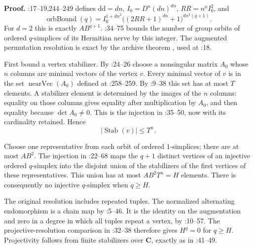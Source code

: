 \documentclass[11pt,a4paper]{article}
\theoremstyle{definition}
\renewcommand{\paragraph}[1]{\par\smallskip\noindent\textbf{#1}\quad\ignorespaces}
\begin{document}
\paragraph{Proof.}
:17--19,244--249 defines
$\mathrm{dd}=dn$, $I_0=D^n(dn)^{dn}$, $RR=n^nI_0^2$, and
\[
 \operatorname{orbBound}(q)
 =I_0^{1+dn^2}\bigl((2RR+1)^{dn}+1\bigr)^{dn^2(q+1)}.
\]
For $d=2$ this is exactly $AB^{q+1}$.
:34--75 bounds the number
of group orbits of ordered $q$-simplices of its Hermitian nerve by
this integer.  The augmented permutation resolution is exact by the
archive theorem , used at
:18.

First bound a vertex stabilizer.  By
:24--26 choose a nonsingular
matrix $A_0$ whose $n$ columns are minimal vectors of the vertex $v$.
Every minimal vector of $v$ is in the set
$\operatorname{nearVec}(A_0)$ defined at
:258--259.
By :9--38 this set has at most
$T$ elements.  A stabilizer element is determined by the images of
the $n$ columns: equality on those columns gives equality after
multiplication by $A_0$, and then equality because $\det A_0\ne0$.
This is the injection in :35--50, now with its
cardinality retained.  Hence
\[
 |\operatorname{Stab}(v)|\le T^n.
\tag{KT-C7.3}
\]

Choose one representative from each orbit of ordered $1$-simplices;
there are at most $AB^2$.  The injection in
:22--68
maps the $q+1$ distinct vertices of an injective ordered $q$-simplex
into the disjoint union of the stabilizers of the first vertices of
these representatives.  This union has at most $AB^2T^n=H$ elements.
There is consequently no injective $q$-simplex when $q\ge H$.

The original resolution includes repeated tuples.  The normalized
alternating endomorphism is a chain map by
:5--46.
It is the identity on the augmentation and zero in a degree in which
all tuples repeat a vertex, by
:10--57.
The projective-resolution comparison in
:32--38
therefore gives $H^q=0$ for $q\ge H$.
Projectivity follows from finite stabilizers over $\mathbf C$, exactly
as in :41--49.
\end{document}
